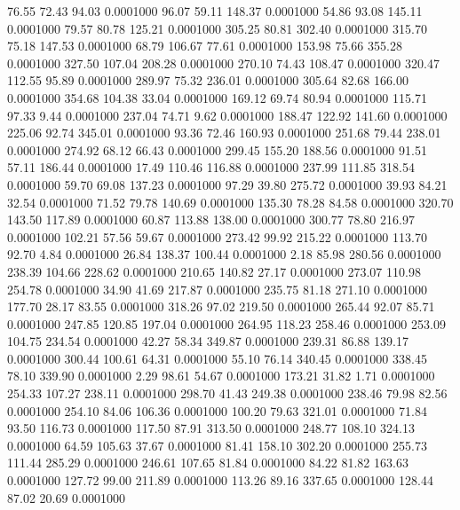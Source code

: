   76.55   72.43   94.03   0.0001000
  96.07   59.11  148.37   0.0001000
  54.86   93.08  145.11   0.0001000
  79.57   80.78  125.21   0.0001000
 305.25   80.81  302.40   0.0001000
 315.70   75.18  147.53   0.0001000
  68.79  106.67   77.61   0.0001000
 153.98   75.66  355.28   0.0001000
 327.50  107.04  208.28   0.0001000
 270.10   74.43  108.47   0.0001000
 320.47  112.55   95.89   0.0001000
 289.97   75.32  236.01   0.0001000
 305.64   82.68  166.00   0.0001000
 354.68  104.38   33.04   0.0001000
 169.12   69.74   80.94   0.0001000
 115.71   97.33    9.44   0.0001000
 237.04   74.71    9.62   0.0001000
 188.47  122.92  141.60   0.0001000
 225.06   92.74  345.01   0.0001000
  93.36   72.46  160.93   0.0001000
 251.68   79.44  238.01   0.0001000
 274.92   68.12   66.43   0.0001000
 299.45  155.20  188.56   0.0001000
  91.51   57.11  186.44   0.0001000
  17.49  110.46  116.88   0.0001000
 237.99  111.85  318.54   0.0001000
  59.70   69.08  137.23   0.0001000
  97.29   39.80  275.72   0.0001000
  39.93   84.21   32.54   0.0001000
  71.52   79.78  140.69   0.0001000
 135.30   78.28   84.58   0.0001000
 320.70  143.50  117.89   0.0001000
  60.87  113.88  138.00   0.0001000
 300.77   78.80  216.97   0.0001000
 102.21   57.56   59.67   0.0001000
 273.42   99.92  215.22   0.0001000
 113.70   92.70    4.84   0.0001000
  26.84  138.37  100.44   0.0001000
   2.18   85.98  280.56   0.0001000
 238.39  104.66  228.62   0.0001000
 210.65  140.82   27.17   0.0001000
 273.07  110.98  254.78   0.0001000
  34.90   41.69  217.87   0.0001000
 235.75   81.18  271.10   0.0001000
 177.70   28.17   83.55   0.0001000
 318.26   97.02  219.50   0.0001000
 265.44   92.07   85.71   0.0001000
 247.85  120.85  197.04   0.0001000
 264.95  118.23  258.46   0.0001000
 253.09  104.75  234.54   0.0001000
  42.27   58.34  349.87   0.0001000
 239.31   86.88  139.17   0.0001000
 300.44  100.61   64.31   0.0001000
  55.10   76.14  340.45   0.0001000
 338.45   78.10  339.90   0.0001000
   2.29   98.61   54.67   0.0001000
 173.21   31.82    1.71   0.0001000
 254.33  107.27  238.11   0.0001000
 298.70   41.43  249.38   0.0001000
 238.46   79.98   82.56   0.0001000
 254.10   84.06  106.36   0.0001000
 100.20   79.63  321.01   0.0001000
  71.84   93.50  116.73   0.0001000
 117.50   87.91  313.50   0.0001000
 248.77  108.10  324.13   0.0001000
  64.59  105.63   37.67   0.0001000
  81.41  158.10  302.20   0.0001000
 255.73  111.44  285.29   0.0001000
 246.61  107.65   81.84   0.0001000
  84.22   81.82  163.63   0.0001000
 127.72   99.00  211.89   0.0001000
 113.26   89.16  337.65   0.0001000
 128.44   87.02   20.69   0.0001000
